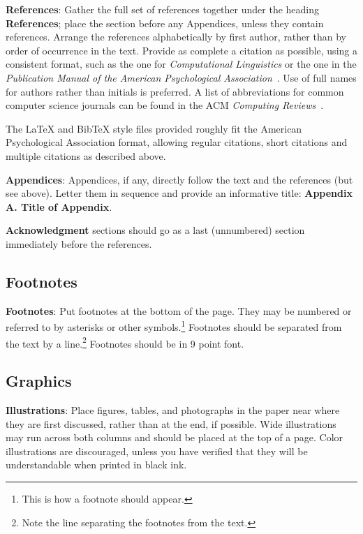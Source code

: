 \documentclass[11pt,letterpaper]{article}
\begin{document}
\textbf{References}: Gather the full set of references together under
the heading {\bf References}; place the section before any Appendices,
unless they contain references. Arrange the references alphabetically
by first author, rather than by order of occurrence in the text.
Provide as complete a citation as possible, using a consistent format,
such as the one for {\em Computational Linguistics\/} or the one in the 
{\em Publication Manual of the American 
Psychological Association\/}~\cite{APA:83}.  Use of full names for
authors rather than initials is preferred.  A list of abbreviations
for common computer science journals can be found in the ACM 
{\em Computing Reviews\/}~\cite{ACM:83}.

The \LaTeX{} and Bib\TeX{} style files provided roughly fit the
American Psychological Association format, allowing regular citations, 
short citations and multiple citations as described above.

{\bf Appendices}: Appendices, if any, directly follow the text and the
references (but see above).  Letter them in sequence and provide an
informative title: {\bf Appendix A. Title of Appendix}.

\textbf{Acknowledgment} sections should go as a last (unnumbered) section immediately
before the references.  

\subsection{Footnotes}

{\bf Footnotes}: Put footnotes at the bottom of the page. They may
be numbered or referred to by asterisks or other
symbols.\footnote{This is how a footnote should appear.} Footnotes
should be separated from the text by a line.\footnote{Note the
line separating the footnotes from the text.}  Footnotes should be in 9 point font.

\subsection{Graphics}

{\bf Illustrations}: Place figures, tables, and photographs in the
paper near where they are first discussed, rather than at the end, if
possible.  Wide illustrations may run across both columns and should be placed at
the top of a page. Color illustrations are discouraged, unless you have verified that 
they will be understandable when printed in black ink.
\end{document}
